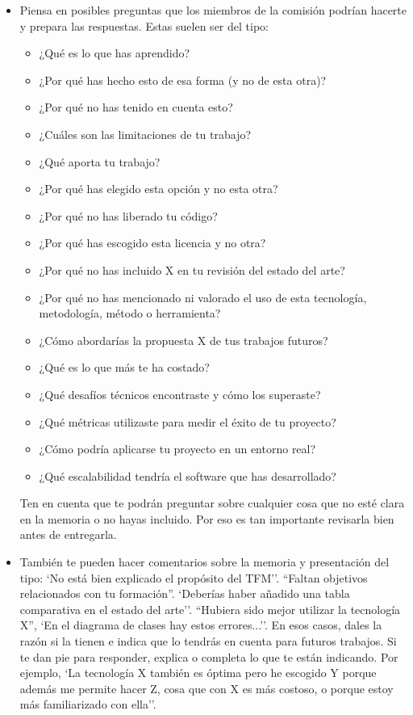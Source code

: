 \begin{itemize}
    \item Piensa en posibles preguntas que los miembros de la comisión podrían hacerte y prepara las respuestas. Estas suelen ser del tipo:

    \begin{itemize}
        \item ¿Qué es lo que has aprendido?
        \item ¿Por qué has hecho esto de esa forma (y no de esta otra)?
        \item ¿Por qué no has tenido en cuenta esto?
        \item ¿Cuáles son las limitaciones de tu trabajo?
        \item ¿Qué aporta tu trabajo?
        \item ¿Por qué has elegido esta opción y no esta otra?
        \item ¿Por qué no has liberado tu código? 
        \item ¿Por qué has escogido esta licencia y no otra?
        \item ¿Por qué no has incluido X en tu revisión del estado del arte?
        \item ¿Por qué no has mencionado ni valorado el uso de esta tecnología, metodología, método o herramienta?
        \item ¿Cómo abordarías la propuesta X de tus trabajos futuros? 
        \item ¿Qué es lo que más te ha costado?
        \item ¿Qué desafíos técnicos encontraste y cómo los superaste?
        \item ¿Qué métricas utilizaste para medir el éxito de tu proyecto?
        \item ¿Cómo podría aplicarse tu proyecto en un entorno real?
        \item ¿Qué escalabilidad tendría el software que has desarrollado?
       
    \end{itemize}

    Ten en cuenta que te podrán preguntar sobre cualquier cosa que no esté clara en la memoria o no hayas incluido. Por eso es tan importante revisarla bien antes de entregarla.

     \item También te pueden hacer comentarios sobre la memoria y presentación del tipo: `No está bien explicado el propósito del TFM''. ``Faltan objetivos relacionados con tu formación''. `Deberías haber añadido una tabla comparativa en el estado del arte''. ``Hubiera sido mejor utilizar la tecnología X'', `En el diagrama de clases hay estos errores...''. En esos casos, dales la razón si la tienen e indica que lo tendrás en cuenta para futuros trabajos. Si te dan pie para responder, explica o completa lo que te están indicando. Por ejemplo, `La tecnología X también es óptima pero he escogido Y porque además me permite hacer Z, cosa que con X es más costoso, o porque estoy más familiarizado con ella''.  


\end{itemize}
